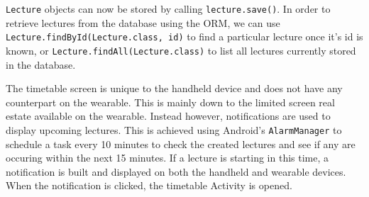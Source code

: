 \texttt{Lecture} objects can now be stored by calling \texttt{lecture.save()}.
In order to retrieve lectures from the database using the ORM, we can use
\texttt{Lecture.findById(Lecture.class, id)} to find a particular lecture once
it's id is known, or \texttt{Lecture.findAll(Lecture.class)} to list all
lectures currently stored in the database.

The timetable screen is unique to the handheld device and does not have any
counterpart on the wearable. This is mainly down to the limited screen
real estate available on the wearable. Instead however, notifications are used
to display upcoming lectures. This is achieved using Android's
\texttt{AlarmManager} to schedule a task every 10 minutes to check the created
lectures and see if any are occuring within the next 15 minutes. If a lecture
is starting in this time, a notification is built and displayed on both the
handheld and wearable devices. When the notification is clicked, the timetable
Activity is opened.

